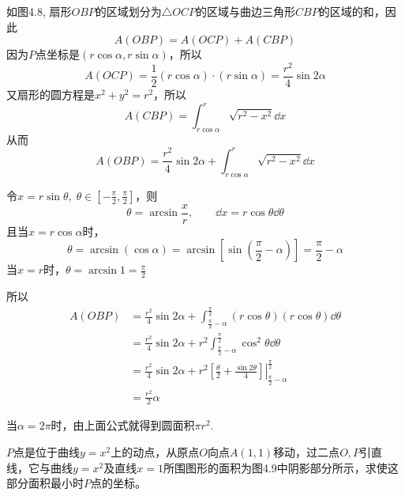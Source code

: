 \begin{figure}[htp]
    \centering
{}
    \caption{}
\end{figure}

\begin{solution}
    如图4.8, 扇形$OBP$的区域划分为$\triangle OCP$的区域与曲边三角形$CBP$的区域的和，因此
\[A (OBP) =A (OCP) +A (CBP) \]
因为$P$点坐标是$(r\cos\alpha, r\sin\alpha)$，所以
\[A(OCP)=\frac{1}{2}(r\cos\alpha)\cdot (r\sin\alpha)=\frac{r^2}{4}\sin 2\alpha\]
又扇形的圆方程是$x^2+y^2=r^2$，所以
\[A(CBP)=\int^r_{r\cos \alpha}\sqrt{r^2-x^2}\dd x\]
从而
\[A(OBP)=\frac{r^2}{4}\sin2\alpha+\int^r_{r\cos \alpha}\sqrt{r^2-x^2}\dd x\]

令$x=r\sin\theta,\; \theta\in\left[-\frac{\pi}{2},\frac{\pi}{2}\right]$，则
\[\theta=\arcsin\frac{x}{r},\qquad \dd x=r\cos\theta \dd\theta\]
且当$x=r\cos \alpha$时，
\[\theta=\arcsin(\cos\alpha)=\arcsin\left[\sin\left(\frac{\pi}{2}-\alpha\right)\right]=\frac{\pi}{2}-\alpha\]
当$x=r$时，$\theta=\arcsin 1=\frac{\pi}{2}$

所以
\[\begin{split}
    A(OBP)&=\frac{r^2}{4}\sin2\alpha+\int^{\tfrac{\pi}{2}}_{\tfrac{\pi}{2}-\alpha}(r\cos\theta)(r\cos\theta)\dd \theta\\
&=\frac{r^2}{4}\sin2\alpha+r^2\int^{\tfrac{\pi}{2}}_{\tfrac{\pi}{2}-\alpha}\cos^2\theta\dd\theta\\ 
&=\frac{r^2}{4}\sin2\alpha+r^2\left.\left[\frac{\theta}{2}+\frac{\sin 2\theta}{4}\right]\right|^{\tfrac{\pi}{2}}_{\tfrac{\pi}{2}-\alpha}\\
&=\frac{r^2}{2}\alpha
\end{split}\]

当$\alpha=2\pi$时，由上面公式就得到圆面积$\pi r^2$.
\end{solution}

\begin{example}
$P$点是位于曲线$y=x^2$上的动点，从原点$O$向点$A(1, 1)$移动，过二点$O,P$引直线，它与曲线$y=x^2$及直线$x=1$所围图形的面积为图4.9中阴影部分所示，求使这部分面积最小时$P$点的坐标。
\end{example}


